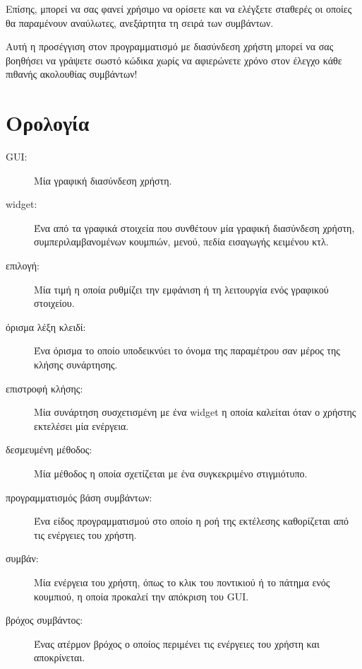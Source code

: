 \documentclass[10pt]{book}
\begin{document}
Επίσης, μπορεί να σας φανεί χρήσιμο να ορίσετε και να ελέγξετε σταθερές οι οποίες θα 
παραμένουν αναύλωτες, ανεξάρτητα τη σειρά των συμβάντων.

Αυτή η προσέγγιση στον προγραμματισμό με διασύνδεση χρήστη μπορεί να σας βοηθήσει να γράψετε 
σωστό κώδικα χωρίς να αφιερώνετε χρόνο στον έλεγχο κάθε πιθανής ακολουθίας συμβάντων!



 
\section{Ορολογία}

\begin{description} 

\item[GUI:]  Μία γραφική διασύνδεση χρήστη. 

\item[widget:]  Ένα από τα γραφικά στοιχεία που συνθέτουν μία γραφική διασύνδεση χρήστη, 
συμπεριλαμβανομένων κουμπιών, μενού, πεδία εισαγωγής κειμένου κτλ.

\item[επιλογή:] Μία τιμή η οποία ρυθμίζει την εμφάνιση ή τη λειτουργία ενός γραφικού στοιχείου.

\item[όρισμα λέξη κλειδί:] Ένα όρισμα το οποίο υποδεικνύει το όνομα της παραμέτρου σαν μέρος 
της κλήσης συνάρτησης.

\item[επιστροφή κλήσης:] Μία συνάρτηση συσχετισμένη με ένα widget η οποία καλείται 
όταν ο χρήστης εκτελέσει μία ενέργεια.

\item[δεσμευμένη μέθοδος:] Μία μέθοδος η οποία σχετίζεται με ένα συγκεκριμένο στιγμιότυπο.

\item[προγραμματισμός βάση συμβάντων:] Ένα είδος προγραμματισμού στο οποίο η ροή της εκτέλεσης 
καθορίζεται από τις ενέργειες του χρήστη.

\item[συμβάν:] Μία ενέργεια του χρήστη, όπως το κλικ του ποντικιού ή το πάτημα ενός κουμπιού, 
η οποία προκαλεί την απόκριση του GUI. 

\item[βρόχος συμβάντος:] Ένας ατέρμον βρόχος ο οποίος περιμένει τις ενέργειες του χρήστη και 
αποκρίνεται.


\end{description}
\end{document}
